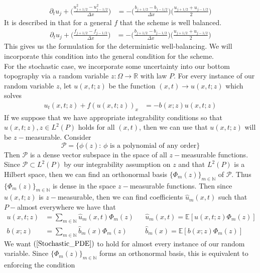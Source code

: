 \documentclass[12pt]{article}
\begin{document}
\begin{align}
    \partial_t u_j + \Big(\frac{u_{j+1/2}^2-u_{j-1/2}^2}{\Delta x}\Big) &= -\Big(\frac{b_{j+1/2}-b_{j-1/2}}{\Delta x}\Big)\Big(\frac{u_{j+1/2}+u_{j-1/2}}{2}\Big)\label{semidiscrete_burgers}
\end{align}
It is described in \cite{Jin2001} that for a general $f$ that the scheme is well balanced. 
\begin{align}
    \partial_t u_j + \Big(\frac{f_{j+1/2}-f_{j-1/2}}{\Delta x}\Big) &= -\Big(\frac{b_{j+1/2}-b_{j-1/2}}{\Delta x}\Big)\Big(\frac{u_{j+1/2}+u_{j-1/2}}{2}\Big) \label{deterministic_wb}
\end{align}
This gives us the formulation for the deterministic well-balancing. We will incorporate this condition into the general condition for the scheme.\\ \newline
For the stochastic case, we incorporate some uncertainty into our bottom topography via a random variable $z:\Omega\to\mathbb{R}$ with law $P$. For every instance of our random variable $z$, let $u(x,t;z)$ be the function $(x,t)\to u(x,t;z)$ which solves
\begin{align}  \label{Stochastic_PDE}
    u_t(x,t;z) + f(u(x,t;z))_x &= - b(x;z)u(x,t;z)
\end{align}
If we suppose that we have appropriate integrability conditions so that $u(x,t;z),z\in L^2(P)$ holds for all $(x,t)$, then we can use that $u(x,t;z)$ will be $z-$measurable. Consider $$\mathcal{P} = \{\phi(z):\,\phi\,\,\text{is a polynomial of any order}\}$$ 
Then $\mathcal{P}$ is a dense vector subspace in the space of all $z-$measurable functions. Since $\mathcal{P}\subset L^2(P)$ by our integrability assumption on $z$ and that $L^2(P)$ is a Hilbert space, then we can find an orthonormal basis $\{\Phi_m(z)\}_{m\in\mathbb{N}}$ of $\mathcal{P}$. Thus $\{\Phi_m(z)\}_{m\in\mathbb{N}}$ is dense in the space $z-$measurable functions. Then since $u(x,t;z)$ is $z-$measurable, then we can find coefficients $\hat{u}_m(x,t)$ such that $P-$almost everywhere we have that
\begin{align}
    u(x,t;z) &= \sum_{m\in\mathbb{N}}\hat{u}_m(x,t)\Phi_m(z)&&\hat{u}_m(x,t) = \mathbb{E}[u(x,t;z)\Phi_m(z)]\nonumber\\
    b(x;z) &= \sum_{m\in\mathbb{N}}\hat{b}_m(x)\Phi_m(z)&&\hat{b}_m(x) = \mathbb{E}[b(x;z)\Phi_m(z)]\nonumber
\end{align}
We want $(\ref{Stochastic_PDE})$ to hold for almost every instance of our random variable. Since $\{\Phi_m(z)\}_{m\in\mathbb{N}}$ forms an orthonormal basis, this is equivalent to enforcing the condition
\end{document}
